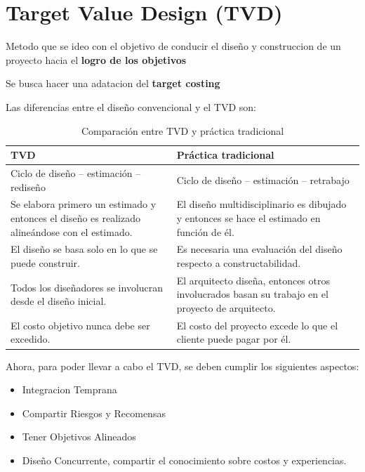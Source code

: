 \section{Target Value Design (TVD)}

Metodo que se ideo con el objetivo de conducir el diseño y construccion de un proyecto
hacia el \textbf{logro de los objetivos}

Se busca hacer una adatacion del \textbf{target costing} 

Las diferencias entre el diseño convencional y el TVD son:

\begin{table}[h!]
\centering
\begin{tabular}{|p{6.5cm}|p{6.5cm}|}
\hline
\textbf{TVD} & \textbf{Práctica tradicional} \\
\hline
Ciclo de diseño – estimación – rediseño & Ciclo de diseño – estimación – retrabajo \\
\hline
Se elabora primero un estimado y entonces el diseño es realizado alineándose con el estimado. & El diseño multidisciplinario es dibujado y entonces se hace el estimado en función de él. \\
\hline
El diseño se basa solo en lo que se puede construir. & Es necesaria una evaluación del diseño respecto a constructabilidad. \\
\hline
Todos los diseñadores se involucran desde el diseño inicial. & El arquitecto diseña, entonces otros involucrados basan su trabajo en el proyecto de arquitecto. \\
\hline
El costo objetivo nunca debe ser excedido. & El costo del proyecto excede lo que el cliente puede pagar por él. \\
\hline
\end{tabular}
\caption{Comparación entre TVD y práctica tradicional}
\end{table}

Ahora, para poder llevar a cabo el TVD, se deben cumplir los siguientes aspectos:

\begin{itemize}
    \item Integracion Temprana
    \item Compartir Riesgos y Recomensas
    \item Tener Objetivos Alineados
    \item Diseño Concurrente, compartir el conocimiento sobre costos y experiencias.
\end{itemize}

